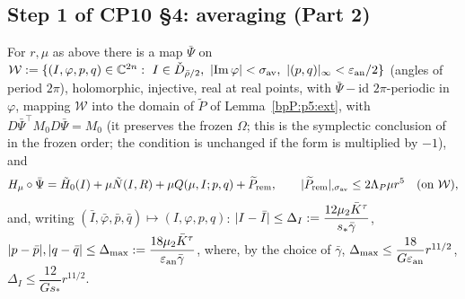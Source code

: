 \subsection{Step 1 of CP10 \S4: averaging (Part 2)}\label{bpP:p5:kam-application}

\begin{proposition}\label{bpP:p5:avg}
For $r,\mu$ as above there is a map $\bar\Psi$ on $\mathcal W:=\{(I,\varphi,p,q)\in\C^{2n}:\ I\in\check D_{\bar\rho/2},\ \abs{\operatorname{Im}\varphi}<\sigma_{\rm av},\ \abs{(p,q)}_\infty<\varepsilon_{\rm an}/2\}$ (angles of period $2\pi$), holomorphic, injective, real at real points, with $\bar\Psi-\mathrm{id}$ $2\pi$-periodic in $\varphi$, mapping $\mathcal W$ into the domain of $\tilde P$ of Lemma~\ref{bpP:p5:ext}, with $D\bar\Psi^\top M_0D\bar\Psi=M_0$ (it preserves the frozen $\Omega$; this is the symplectic conclusion of  in the frozen order; the condition is unchanged if the form is multiplied by $-1$), and
\[H_\mu\circ\bar\Psi=\tilde H_0(I)+\mu\tilde N(I,R)+\mu Q(\mu,I;p,q)+\widetilde P_{\rm rem},\qquad\lvert \widetilde P_{\rm rem}\rvert_{,\sigma_{\rm av}}\le2\Lambda_P\mu r^5\quad(\text{on }\mathcal W),\]
and, writing $(\bar I,\bar\varphi,\bar p,\bar q)\mapsto(I,\varphi,p,q)$: $\lvert I-\bar I\rvert\le\Delta_I:=\dfrac{12\mu_2\bar K^\tau}{s_*\bar\gamma}$, $\lvert p-\bar p\rvert,\lvert q-\bar q\rvert\le\Delta_{\max}:=\dfrac{18\mu_2\bar K^\tau}{\varepsilon_{\rm an}\bar\gamma}$, where, by the choice of $\bar\gamma$, $\Delta_{\max}\le\dfrac{18}{G\varepsilon_{\rm an}}r^{11/2}$, $\Delta_I\le\dfrac{12}{Gs_*}r^{11/2}$.
\end{proposition}
